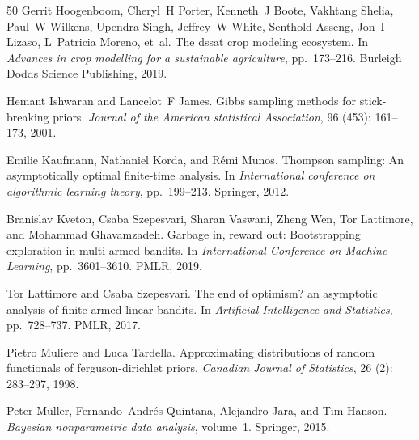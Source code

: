 \documentclass[10pt]{article}
\begin{document}
\begin{thebibliography}{50}
Gerrit Hoogenboom, Cheryl~H Porter, Kenneth~J Boote, Vakhtang Shelia, Paul~W Wilkens, Upendra Singh, Jeffrey~W White, Senthold Asseng, Jon~I Lizaso, L~Patricia Moreno, et~al.
\newblock The dssat crop modeling ecosystem.
\newblock In \emph{Advances in crop modelling for a sustainable agriculture}, pp.\  173--216. Burleigh Dodds Science Publishing, 2019.

Hemant Ishwaran and Lancelot~F James.
\newblock Gibbs sampling methods for stick-breaking priors.
\newblock \emph{Journal of the American statistical Association}, 96 (453): 161--173, 2001.

Emilie Kaufmann, Nathaniel Korda, and R{\'e}mi Munos.
\newblock Thompson sampling: An asymptotically optimal finite-time analysis.
\newblock In \emph{International conference on algorithmic learning theory}, pp.\  199--213. Springer, 2012.

Branislav Kveton, Csaba Szepesvari, Sharan Vaswani, Zheng Wen, Tor Lattimore, and Mohammad Ghavamzadeh.
\newblock Garbage in, reward out: Bootstrapping exploration in multi-armed bandits.
\newblock In \emph{International Conference on Machine Learning}, pp.\  3601--3610. PMLR, 2019.

Tor Lattimore and Csaba Szepesvari.
\newblock The end of optimism? an asymptotic analysis of finite-armed linear bandits.
\newblock In \emph{Artificial Intelligence and Statistics}, pp.\  728--737. PMLR, 2017.

Pietro Muliere and Luca Tardella.
\newblock Approximating distributions of random functionals of ferguson-dirichlet priors.
\newblock \emph{Canadian Journal of Statistics}, 26 (2): 283--297, 1998.

Peter M{\"u}ller, Fernando~Andr{\'e}s Quintana, Alejandro Jara, and Tim Hanson.
\newblock \emph{Bayesian nonparametric data analysis}, volume~1.
\newblock Springer, 2015.


\end{thebibliography}
\end{document}
